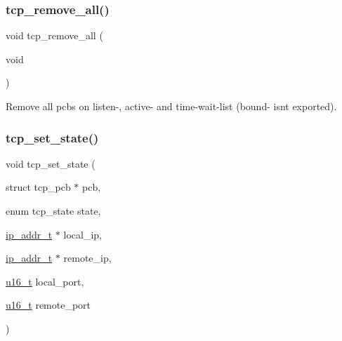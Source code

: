 \subsubsection{\texorpdfstring{tcp\+\_\+remove\+\_\+all()}{tcp\_remove\_all()}}
{\footnotesize\ttfamily void tcp\+\_\+remove\+\_\+all (\begin{DoxyParamCaption}\item[{void}]{ }\end{DoxyParamCaption})}

Remove all pcbs on listen-\/, active-\/ and time-\/wait-\/list (bound-\/ isn\textquotesingle{}t exported). \mbox{\label{openmote-cc2538_2lwip_2test_2unit_2tcp_2tcp__helper_8h_a39f3f73a5ac75fb0de5253cc0a1da423}} 
\subsubsection{\texorpdfstring{tcp\+\_\+set\+\_\+state()}{tcp\_set\_state()}}
{\footnotesize\ttfamily void tcp\+\_\+set\+\_\+state (\begin{DoxyParamCaption}\item[{struct tcp\+\_\+pcb $\ast$}]{pcb,  }\item[{enum tcp\+\_\+state}]{state,  }\item[{\hyperlink{native_2lwip_2src_2include_2lwip_2ip__addr_8h_a88b43639738c4de2d3cd22e3a1fd7696}{ip\+\_\+addr\+\_\+t} $\ast$}]{local\+\_\+ip,  }\item[{\hyperlink{native_2lwip_2src_2include_2lwip_2ip__addr_8h_a88b43639738c4de2d3cd22e3a1fd7696}{ip\+\_\+addr\+\_\+t} $\ast$}]{remote\+\_\+ip,  }\item[{\hyperlink{group__compiler__abstraction_ga77570ac4fcab86864fa1916e55676da2}{u16\+\_\+t}}]{local\+\_\+port,  }\item[{\hyperlink{group__compiler__abstraction_ga77570ac4fcab86864fa1916e55676da2}{u16\+\_\+t}}]{remote\+\_\+port }\end{DoxyParamCaption})}


